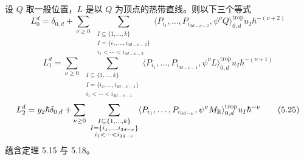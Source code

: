 \begin{lemma}
  设 $Q$ 取一般位置，$L$ 是以 $Q$ 为顶点的热带直线。则以下三个等式
  \begin{equation}
    L_0^d=\delta_{0,d}+\sum_{\nu\ge 0}\ \sum_{\substack{I\subseteq\{1,\ldots,k\}\\ I=\{i_1,\ldots,i_{3d-\nu-2}\}\\ i_1<\cdots<i_{3d-\nu-2}}}
    \langle P_{i_1},\ldots,P_{i_{3d-\nu-2}},\psi^\nu Q\rangle_{0,d}^{\mathrm{trop}}u_I\hbar^{-(\nu+2)} \tag{5.23}
  \end{equation}
  \begin{equation}
    L_1^d=\sum_{\nu\ge 0}\ \sum_{\substack{I\subseteq\{1,\ldots,k\}\\ I=\{i_1,\ldots,i_{3d-\nu-1}\}\\ i_1<\cdots<i_{3d-\nu-1}}}
    \langle P_{i_1},\ldots,P_{i_{3d-\nu-1}},\psi^\nu L\rangle_{0,d}^{\mathrm{trop}}u_I\hbar^{-(\nu+1)} \tag{5.24}
  \end{equation}
  \begin{equation}
    L_2^d=y_2\hbar\delta_{0,d}+\sum_{\nu\ge 0}\ \sum_{\substack{I\subseteq\{1,\ldots,k\}\\ I=\{i_1,\ldots,i_{3d-\nu}\}\\ i_1<\cdots<i_{3d-\nu}}}
    \langle P_{i_1},\ldots,P_{i_{3d-\nu}},\psi^\nu M_\R\rangle_{0,d}^{\mathrm{trop}}u_I\hbar^{-\nu} \tag{5.25}
  \end{equation}
  蕴含定理 5.15 与 5.18。
\end{lemma}


